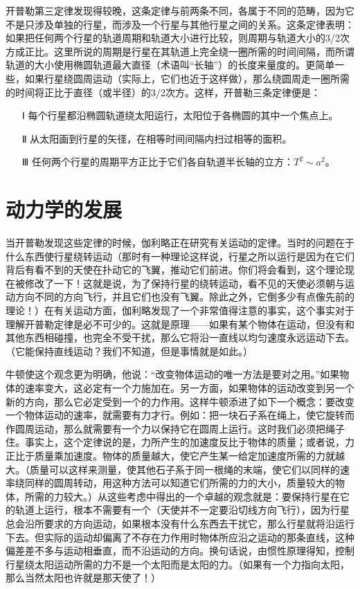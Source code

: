 \documentclass[12pt,oneside]{book}
\begin{document}
开普勒第三定律发现得较晚，这条定律与前两条不同，各属于不同的范畴，因为它不是只涉及单独的行星，而涉及一个行星与其他行星之间的关系。这条定律表明：如果把任何两个行星的轨道周期和轨道大小进行比较，则周期与轨道大小的3/2次方成正比。这里所说的周期是行星在其轨道上完全绕一圈所需的时间间隔，而所谓轨道的大小使用椭圆轨道最大直径（术语叫“长轴”）的长度来量度的。更简单一些，如果行星绕圆周运动（实际上，它们也近于这样做），那么绕圆周走一圈所需的时间将正比于直径（或半径）的3/2次方。这样，开普勒三条定律便是：
\begin{enumerate}
\item[Ⅰ] 每个行星都沿椭圆轨道绕太阳运行，太阳位于各椭圆的其中一个焦点上。
\item[Ⅱ] 从太阳画到行星的矢径，在相等时间间隔内扫过相等的面积。
\item[Ⅲ] 任何两个行星的周期平方正比于它们各自轨道半长轴的立方：$T^2\sim a^2$。
\end{enumerate}


\section{动力学的发展}
当开普勒发现这些定律的时候，伽利略正在研究有关运动的定律。当时的问题在于什么东西使行星绕转运动（那时有一种理论这样说，行星之所以运行是因为在它们背后有看不到的天使在扑动它的飞翼，推动它们前进。你们将会看到，这个理论现在被修改了一下！这就是说，为了保持行星的绕转运动，看不见的天使必须朝与运动方向不同的方向飞行，并且它们也没有飞翼。除此之外，它倒多少有点像先前的理论！）在有关运动方面，伽利略发现了一个非常值得注意的事实，这个事实对于理解开普勒定律是必不可少的。这就是原理——如果有某个物体在运动，但没有和其他东西相碰撞，也完全不受干扰，那么它将沿一直线以均匀速度永远运动下去。（它能保持直线运动？我们不知道，但是事情就是如此。）

牛顿使这个观念更为明确，他说：“改变物体运动的唯一方法是要对之用。”如果物体的速率变大，这必定有一个力施加在。另一方面，如果物体的运动改变到另一个新的方向，那么它必定受到一个的力作用。这样牛顿添进了如下一个概念：要改变一个物体运动的速率，就需要有力才行。例如：把一块石子系在绳上，使它旋转而作圆周运动，那么就需要有一个力以保持它在圆周上运行。这时我们必须把绳子住。事实上，这个定律说的是，力所产生的加速度反比于物体的质量；或者说，力正比于质量乘加速度。物体的质量越大，使它产生某一给定加速度所需的力就越大。（质量可以这样来测量，使其他石子系于同一根绳的末端，使它们以同样的速率绕同样的圆周转动，用这种方法可以知道它们所需的力的大小，质量较大的物体，所需的力较大。）从这些考虑中得出的一个卓越的观念就是：要保持行星在它的轨道上运行，根本不需要有一个（天使并不一定要沿切线方向飞行），因为行星总会沿所要求的方向运动，如果根本没有什么东西去干扰它，那么行星就将沿运行下去。但实际的运动却偏离了不存在力作用时物体所应沿之运动的那条直线，这种偏差差不多与运动相垂直，而不沿运动的方向。换句话说，由惯性原理得知，控制行星绕太阳运动所需的力不是一个太阳而是太阳的力。（如果有一个力指向太阳，那么当然太阳也许就是那天使了！）
\end{document}
